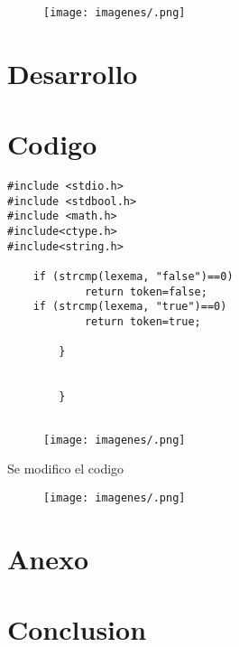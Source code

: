 \documentclass[12pt]{article}
\begin{document}
\begin{figure}[H]%
\centering
\texttt{[image: imagenes/.png]}
\caption{}
\end{figure}
\newpage


\section{Desarrollo}
\newpage



\section{Codigo}
\begin{lstlisting}
#include <stdio.h>
#include <stdbool.h>
#include <math.h>
#include<ctype.h>
#include<string.h>

	if (strcmp(lexema, "false")==0)
			return token=false;
	if (strcmp(lexema, "true")==0)
			return token=true;

		}


		}


\end{lstlisting}


\begin{figure}[H]
\centering
\texttt{[image: imagenes/.png]}

\caption{}
\end{figure}
Se modifico el codigo 




\begin{figure}[H]
\centering
\texttt{[image: imagenes/.png]}
\caption{}
\end{figure}


\newpage
\section{Anexo}



\begin{figure}[H]
\centering

\caption{}
\end{figure}





\newpage
\section{Conclusion}




\vspace{20 mm}








\end{document}
